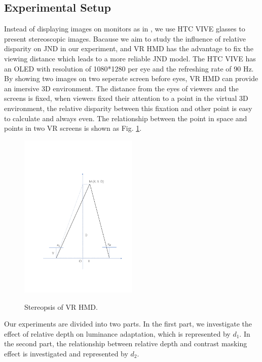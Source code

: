 \documentclass[journal]{IEEEtran}
\begin{document}
\subsection{Experimental Setup}

Instead of displaying images on monitors as in \cite{RN637}, we use HTC VIVE glasses to present stereoscopic images. Bacause we aim to study the influence of relative disparity on JND in our experiment, and VR HMD has the advantage to fix the viewing distance which leads to a more reliable JND model. The HTC VIVE has an OLED with resolution of 1080*1280 per eye and the refreshing rate of 90 Hz. By showing two images on two seperate screen before eyes, VR HMD can provide an imersive 3D environment. The distance from the eyes of viewers and the screens is fixed, when viewers fixed their attention to a point in the virtual 3D environment, the relative disparity between this fixation and other point is easy to calculate and always even. The relationship between the point in space and points in two VR screens is shown as Fig. \ref{fig:Stereopsis}.
\begin{figure}[!t]
	\centering
	\includegraphics[width=0.5\textwidth]{Drawing1}\\
	\caption{Stereopsis of VR HMD.}
	\label{fig:Stereopsis}
\end{figure}

Our experiments are divided into two parts. In the first part, we investigate the effect of relative depth on luminance adaptation, which is represented by $d_1$. In the second part, the relationship between relative depth and contrast masking effect is investigated and represented by $d_2$.
\end{document}

